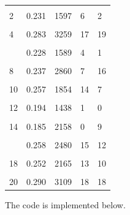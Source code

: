 \documentclass[
]{article}
\begin{document}
\begin{longtable}[t]{lllll}
\endfoot
\bottomrule
\endlastfoot
\cellcolor{gray!6}{1} & \cellcolor{gray!6}{0.259} & \cellcolor{gray!6}{1751} & \cellcolor{gray!6}{16} & \cellcolor{gray!6}{4}\\
2 & 0.231 & 1597 & 6 & 2\\
\cellcolor{gray!6}{3} & \cellcolor{gray!6}{0.203} & \cellcolor{gray!6}{1811} & \cellcolor{gray!6}{2} & \cellcolor{gray!6}{5}\\
4 & 0.283 & 3259 & 17 & 19\\
\cellcolor{gray!6}{5} & \cellcolor{gray!6}{0.243} & \cellcolor{gray!6}{1820} & \cellcolor{gray!6}{9} & \cellcolor{gray!6}{6}\\
\addlinespace
6 & 0.228 & 1589 & 4 & 1\\
\cellcolor{gray!6}{7} & \cellcolor{gray!6}{0.244} & \cellcolor{gray!6}{2170} & \cellcolor{gray!6}{10} & \cellcolor{gray!6}{11}\\
8 & 0.237 & 2860 & 7 & 16\\
\cellcolor{gray!6}{9} & \cellcolor{gray!6}{0.294} & \cellcolor{gray!6}{1730} & \cellcolor{gray!6}{19} & \cellcolor{gray!6}{3}\\
10 & 0.257 & 1854 & 14 & 7\\
\addlinespace
\cellcolor{gray!6}{11} & \cellcolor{gray!6}{0.249} & \cellcolor{gray!6}{2107} & \cellcolor{gray!6}{12} & \cellcolor{gray!6}{8}\\
12 & 0.194 & 1438 & 1 & 0\\
\cellcolor{gray!6}{13} & \cellcolor{gray!6}{0.230} & \cellcolor{gray!6}{2560} & \cellcolor{gray!6}{5} & \cellcolor{gray!6}{13}\\
14 & 0.185 & 2158 & 0 & 9\\
\cellcolor{gray!6}{15} & \cellcolor{gray!6}{0.204} & \cellcolor{gray!6}{2611} & \cellcolor{gray!6}{3} & \cellcolor{gray!6}{14}\\
\addlinespace
16 & 0.258 & 2480 & 15 & 12\\
\cellcolor{gray!6}{17} & \cellcolor{gray!6}{0.248} & \cellcolor{gray!6}{2918} & \cellcolor{gray!6}{11} & \cellcolor{gray!6}{17}\\
18 & 0.252 & 2165 & 13 & 10\\
\cellcolor{gray!6}{19} & \cellcolor{gray!6}{0.241} & \cellcolor{gray!6}{2619} & \cellcolor{gray!6}{8} & \cellcolor{gray!6}{15}\\
20 & 0.290 & 3109 & 18 & 18\\*
\end{longtable}

The code is implemented below.
\end{document}
